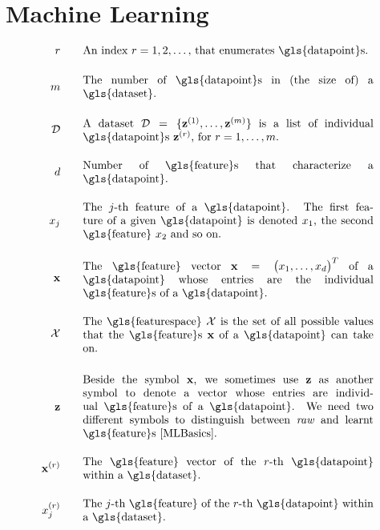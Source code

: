 \newpage
\section*{Machine Learning}

\begin{align}
	\sampleidx \quad\quad & \parbox{.75\textwidth}{An index $\sampleidx=1,2,\ldots,$ that 
		enumerates \gls{datapoint}s.}    \nonumber   \\[4mm] 
	\samplesize \quad\quad &\parbox{.75\textwidth}{The number of \gls{datapoint}s in (the size of) a \gls{dataset}.} \nonumber \\[4mm] 
	\dataset \quad\quad & \parbox{.75\textwidth}{A dataset $\dataset = \{ \datapoint^{(1)},\ldots, \datapoint^{(\samplesize)} \}$ 
		is a list of individual \gls{datapoint}s $\datapoint^{(\sampleidx)}$, for $\sampleidx=1,\ldots,\samplesize$.}    \nonumber   \\[4mm] 
	\featurelen \quad\quad &\parbox{.75\textwidth}{Number of \gls{feature}s that characterize a \gls{datapoint}.} \nonumber \\[4mm] 
	\feature_{\featureidx} \quad\quad &\parbox{.75\textwidth}{The $\featureidx$-th feature of a \gls{datapoint}. The first feature of 
		a given \gls{datapoint} is denoted $\feature_{1}$, the second \gls{feature} $\feature_{2}$ and so on. } \nonumber \\[4mm] 
	\featurevec \quad\quad &\parbox{.75\textwidth}{The \gls{feature} vector $\featurevec=\big(\feature_{1},\ldots,\feature_{\featuredim}\big)^{T}$ of a \gls{datapoint} whose entries are the individual \gls{feature}s of a \gls{datapoint}.} \nonumber \\[4mm] 
	\featurespace \quad\quad & \parbox{.75\textwidth}{The \gls{featurespace} $\featurespace$ is 
		the set of all possible values that the \gls{feature}s $\featurevec$ of a \gls{datapoint} can take on.} \nonumber \\[6mm]
	\rawfeaturevec \quad\quad &\parbox{.75\textwidth}{Beside the symbol $\featurevec$, we 
		sometimes use $\rawfeaturevec$ as another symbol to denote a vector whose entries 
		are individual \gls{feature}s of a \gls{datapoint}. We need two 
		different symbols to distinguish between \emph{raw} and learnt \gls{feature}s \cite[Ch. 9]{MLBasics}.} \nonumber  \\[4mm] 
	\featurevec^{(\sampleidx)} \quad\quad &\parbox{.75\textwidth}{The \gls{feature} vector of the $\sampleidx$-th \gls{datapoint} within a \gls{dataset}. } \nonumber \\[4mm] 
	\feature_{\featureidx}^{(\sampleidx)}\quad\quad &\parbox{.75\textwidth}{The $\featureidx$-th \gls{feature} of the $\sampleidx$-th 
		\gls{datapoint} within a \gls{dataset}.} \nonumber
\end{align}        


